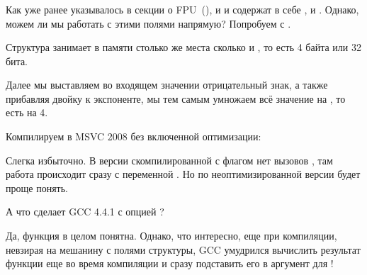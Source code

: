 \subsubsection{\WorkingWithFloatAsWithStructSubSubSectionName}
\label{sec:floatasstruct}

Как уже ранее указывалось в секции о FPU~(), 
и \Tfloat и \Tdouble содержат в себе ,  и . 
Однако, можем ли мы работать с этими полями напрямую? Попробуем с \Tfloat.





Структура  занимает в памяти столько же места сколько и \Tfloat, 
то есть 4 байта или 32 бита.

Далее мы выставляем во входящем значении отрицательный знак, 
а также прибавляя двойку к экспоненте, мы тем 
самым умножаем всё значение на , то есть на 4.

Компилируем в MSVC 2008 без включенной оптимизации:



Слегка избыточно. В версии скомпилированной с флагом \Ox нет вызовов , 
там работа происходит сразу с переменной . Но по неоптимизированной версии будет проще понять.

А что сделает GCC 4.4.1 с опцией \Othree?



Да, функция \ttf в целом понятна. Однако, что интересно, еще при компиляции, 
невзирая на мешанину с полями структуры, GCC умудрился вычислить результат функции  еще
во время компиляции и сразу подставить его в аргумент для \printf{}!

